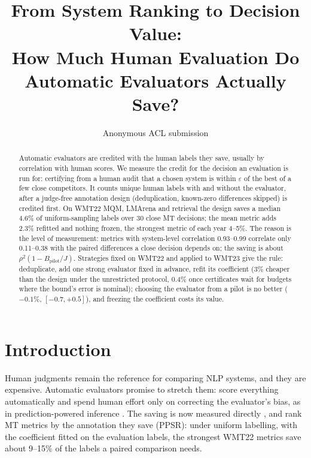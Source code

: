 \documentclass[11pt]{article}
\title{From System Ranking to Decision Value:\\ How Much Human Evaluation Do Automatic Evaluators Actually Save?}
\author{Anonymous ACL submission}
\newcommand{\eps}{\varepsilon}
\newcommand{\Bp}{B_{\mathrm{pilot}}}
\begin{document}
\maketitle

\begin{abstract}
Automatic evaluators are credited with the human labels they save, usually by correlation with human scores. We
measure the credit for the decision an evaluation is run for: certifying from a human audit that a chosen system is
within $\eps$ of the best of a few close competitors. It counts unique human labels with and without the evaluator,
after a judge-free annotation design (deduplication, known-zero differences skipped) is credited first. On WMT22 MQM,
LMArena and retrieval the design saves a median 4.6\% of uniform-sampling labels over 30 close MT decisions; the mean
metric adds 2.3\% refitted and nothing frozen, the strongest metric of each year 4--5\%. The reason is the level of
measurement: metrics with system-level correlation 0.93--0.99 correlate only 0.11--0.38 with the paired differences a
close decision depends on; the saving is about $\rho^2(1-\Bp/J)$. Strategies fixed on WMT22 and applied to WMT23 give
the rule: deduplicate, add one strong evaluator fixed in advance, refit its coefficient (3\% cheaper than the design
under the unrestricted protocol, 0.4\% once certificates wait for budgets where the bound's error is nominal); choosing
the evaluator from a pilot is no better ($-0.1\%$, $[-0.7, +0.5]$), and freezing the coefficient costs its value.
\end{abstract}

\section{Introduction}
Human judgments remain the reference for comparing NLP systems, and they are expensive. Automatic evaluators promise to
stretch them: score everything automatically and spend human effort only on correcting the evaluator's bias, as in
prediction-powered inference \citep[PPI;][]{angelopoulos2023ppi,angelopoulos2023ppipp}. The saving is now measured
directly \citep{boyeau2024autoeval,chen2026noisy}, and \citet{gao2026ppsr} rank MT metrics by the annotation they save
(PPSR): under uniform labelling, with the coefficient fitted on the evaluation labels, the strongest WMT22 metrics save
about 9--15\% of the labels a paired comparison needs.
\end{document}
